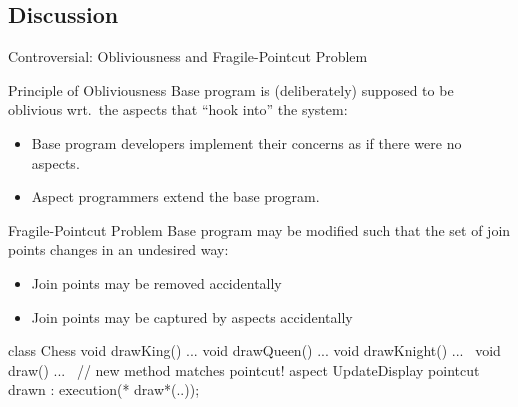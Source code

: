 \subsection{Discussion}

\begin{frame}[fragile]{Controversial: Obliviousness and Fragile-Pointcut Problem}
	\begin{fancycolumns}[widths={45}]
		\begin{definition}{Principle of Obliviousness}
			Base program is (deliberately) supposed to be oblivious wrt.\ the aspects that ``hook into'' the system:
			\begin{itemize}
				\item Base program developers implement their concerns as if there were no aspects.
				\item Aspect programmers extend the base program.
			\end{itemize}
		\end{definition}
	\nextcolumn
		\begin{definition}{Fragile-Pointcut Problem}
			Base program may be modified such that the set of join points changes in an undesired way:
			\begin{itemize}
				\item Join points may be removed accidentally 
				\item Join points may be captured by aspects accidentally
			\end{itemize}
		\end{definition}
		\begin{codetight}{}
class Chess {
	void drawKing() {...}
	void drawQueen() {...}
	void drawKnight() {...}
	~void draw() {...}~ // new method matches pointcut!
}
aspect UpdateDisplay {
	pointcut drawn : execution(* draw*(..));
}
		\end{codetight}
	\end{fancycolumns}
\end{frame}

